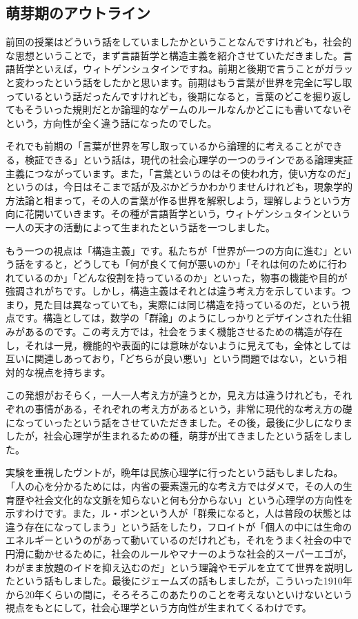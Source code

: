 \documentclass{ltjsbook}
\begin{document}
\subsection{萌芽期のアウトライン}

前回の授業はどういう話をしていましたかということなんですけれども，社会的な思想ということで，まず言語哲学と構造主義を紹介させていただきました。言語哲学といえば，ウィトゲンシュタインですね。前期と後期で言うことがガラッと変わったという話をしたかと思います。前期はもう言葉が世界を完全に写し取っているという話だったんですけれども，後期になると，言葉のどこを掘り返してもそういった規則だとか論理的なゲームのルールなんかどこにも書いてないぞという，方向性が全く違う話になったのでした。

それでも前期の「言葉が世界を写し取っているから論理的に考えることができる，検証できる」という話は，現代の社会心理学の一つのラインである論理実証主義につながっています。また，「言葉というのはその使われ方，使い方なのだ」というのは，今日はそこまで話が及ぶかどうかわかりませんけれども，現象学的方法論と相まって，その人の言葉が作る世界を解釈しよう，理解しようという方向に花開いていきます。その種が言語哲学という，ウィトゲンシュタインという一人の天才の活動によって生まれたという話を一つしました。

もう一つの視点は「構造主義」です。私たちが「世界が一つの方向に進む」という話をすると，どうしても「何が良くて何が悪いのか」「それは何のために行われているのか」「どんな役割を持っているのか」といった，物事の機能や目的が強調されがちです。しかし，構造主義はそれとは違う考え方を示しています。つまり，見た目は異なっていても，実際には同じ構造を持っているのだ，という視点です。構造としては，数学の「群論」のようにしっかりとデザインされた仕組みがあるのです。この考え方では，社会をうまく機能させるための構造が存在し，それは一見，機能的や表面的には意味がないように見えても，全体としては互いに関連しあっており，「どちらが良い悪い」という問題ではない，という相対的な視点を持ちます。

この発想がおそらく，一人一人考え方が違うとか，見え方は違うけれども，それぞれの事情がある，それぞれの考え方があるという，非常に現代的な考え方の礎になっていったという話をさせていただきました。その後，最後に少しになりましたが，社会心理学が生まれるための種，萌芽が出てきましたという話をしました。

実験を重視したヴントが，晩年は民族心理学に行ったという話もしましたね。「人の心を分かるためには，内省の要素還元的な考え方ではダメで，その人の生育歴や社会文化的な文脈を知らないと何も分からない」という心理学の方向性を示すわけです。また，ル・ボンという人が「群衆になると，人は普段の状態とは違う存在になってしまう」という話をしたり，フロイトが「個人の中には生命のエネルギーというのがあって動いているのだけれども，それをうまく社会の中で円滑に動かせるために，社会のルールやマナーのような社会的スーパーエゴが，わがまま放題のイドを抑え込むのだ」という理論やモデルを立てて世界を説明したという話もしました。最後にジェームズの話もしましたが，こういった1910年から20年くらいの間に，そろそろこのあたりのことを考えないといけないという視点をもとにして，社会心理学という方向性が生まれてくるわけです。
\end{document}
